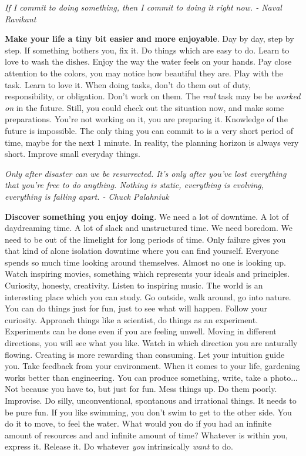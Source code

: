 \documentclass[a4paper,hidelinks]{article}
\begin{document}
\newpage

\begin{center}
\textit{If I commit to doing something, then I commit to doing it right now. - Naval Ravikant}
\end{center}

\textbf{Make your life a tiny bit easier and more enjoyable}.
Day by day, step by step.
If something bothers you, fix it.
Do things which are easy to do.
Learn to love to wash the dishes.
Enjoy the way the water feels on your hands.
Pay close attention to the colors, you may notice how beautiful they are.
Play with the task.
Learn to love it.
When doing tasks, don't do them out of duty, responsibility, or obligation.
Don't work on them.
The \textit{real} task may be be \textit{worked on} in the future.
Still, you could check out the situation now, and make some preparations.
You're not working on it, you are preparing it.
Knowledge of the future is impossible.
The only thing you can commit to is a very short period of time, maybe for the next 1 minute.
In reality, the planning horizon is always very short.
Improve small everyday things.

\newpage

\begin{center}
\textit{Only after disaster can we be resurrected. It's only after you've lost everything that you're free to do anything. Nothing is static, everything is evolving, everything is falling apart. - Chuck Palahniuk}
\end{center}

\textbf{Discover something you enjoy doing}.
We need a lot of downtime.
A lot of daydreaming time.
A lot of slack and unstructured time.
We need boredom.
We need to be out of the limelight for long periods of time.
Only failure gives you that kind of alone isolation downtime where you can find yourself.
Everyone spends so much time looking around themselves.
Almost no one is looking up.
Watch inspiring movies, something which represents your ideals and principles.
Curiosity, honesty, creativity.
Listen to inspiring music.
The world is an interesting place which you can study.
Go outside, walk around, go into nature.
You can do things just for fun, just to see what will happen.
Follow your curiosity.
Approach things like a scientist, do things as an experiment.
Experiments can be done even if you are feeling unwell.
Moving in different directions, you will see what you like.
Watch in which direction you are naturally flowing.
Creating is more rewarding than consuming.
Let your intuition guide you.
Take feedback from your environment.
When it comes to your life, gardening works better than engineering.
You can produce something, write, take a photo...
Not because you have to, but just for fun.
Mess things up.
Do them poorly.
Improvise.
Do silly, unconventional, spontanous and irrational things.
It needs to be pure fun.
If you like swimming, you don't swim to get to the other side.
You do it to move, to feel the water.
What would you do if you had an infinite amount of resources and and infinite amount of time?
Whatever is within you, express it.
Release it.
Do whatever \textit{you} intrinsically \textit{want} to do.
\end{document}
